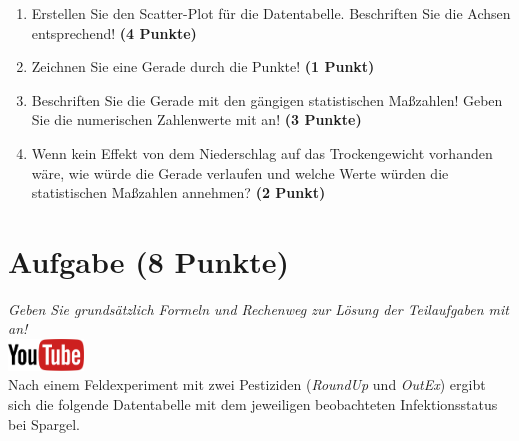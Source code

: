 \documentclass[a4paper, 9pt]{scrartcl}\usepackage[]{graphicx}\usepackage[]{xcolor}
\begin{document}
\begin{enumerate}
\item Erstellen Sie den Scatter-Plot f{\"u}r die Datentabelle. Beschriften Sie
  die Achsen entsprechend! \textbf{(4 Punkte)}
\item Zeichnen Sie eine Gerade durch die Punkte! \textbf{(1 Punkt)}
\item Beschriften Sie die Gerade mit den g{\"a}ngigen statistischen Ma{\ss}zahlen!
  Geben Sie die numerischen Zahlenwerte mit an! \textbf{(3 Punkte)}
\item Wenn kein Effekt von dem Niederschlag auf das Trockengewicht
  vorhanden w{\"a}re, wie w{\"u}rde die Gerade verlaufen und welche Werte w{\"u}rden die
  statistischen Ma{\ss}zahlen annehmen? \textbf{(2 Punkt)}
\end{enumerate} 
\clearpage

\section{Aufgabe \hfill (8 Punkte)}

\textit{Geben Sie grunds{\"a}tzlich Formeln und Rechenweg zur L{\"o}sung der
  Teilaufgaben mit an!} \\[1Ex]

\hfill\href{https://youtu.be/t_1KL77mfmg}{\includegraphics[width =
  2cm]{img/youtube}}\\[1Ex]

Nach einem Feldexperiment mit zwei Pestiziden (\textit{RoundUp} und
\textit{OutEx}) ergibt sich die folgende Datentabelle mit dem jeweiligen
beobachteten Infektionsstatus bei Spargel.
\end{document}
